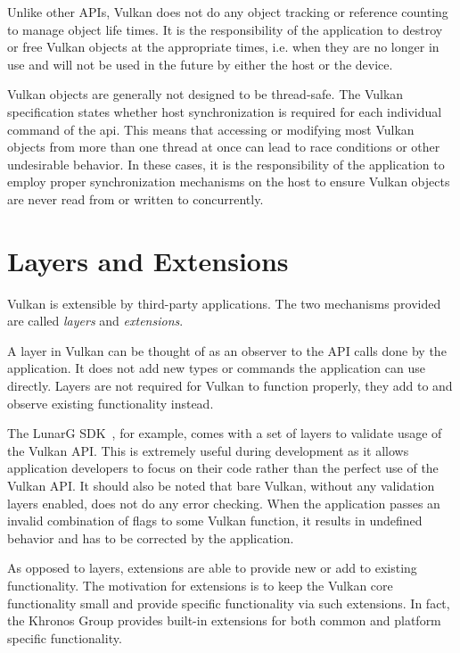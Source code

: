     Unlike other APIs, Vulkan does not do any object tracking or reference counting to manage object life times.
    It is the responsibility of the \gls{application} to destroy or free Vulkan objects at the appropriate times, i.e.
    when they are no longer in use and will not be used in the future by either the \gls{host} or the device.

    Vulkan objects are generally not designed to be thread-safe.
    The Vulkan specification states whether \gls{host} synchronization is required for each individual command of the \gls{api}.
    This means that accessing or modifying most Vulkan objects from more than one thread at once can lead to race conditions or other undesirable behavior.
    In these cases, it is the responsibility of the \gls{application} to employ proper synchronization mechanisms on the \gls{host} to ensure Vulkan objects are never read from or written to concurrently.

  \section{Layers and Extensions}
  \label{sec:LayersAndExtensions}
    Vulkan is extensible by third-party \glspl{application}.
    The two mechanisms provided are called \textit{layers} and \textit{extensions}.

    A layer in Vulkan can be thought of as an observer to the API calls done by the \gls{application}.
    It does not add new types or commands the \gls{application} can use directly.
    Layers are not required for Vulkan to function properly, they add to and observe existing functionality instead.

    The LunarG SDK~\cite{lunargvulkansdk}, for example, comes with a set of layers to validate usage of the Vulkan API. This is extremely useful during development as it allows application developers to focus on their code rather than the perfect use of the Vulkan API. It should also be noted that bare Vulkan, without any validation layers enabled, does not do any error checking. When the \gls{application} passes an invalid combination of flags to some Vulkan function, it results in undefined behavior and has to be corrected by the \gls{application}.

    As opposed to layers, extensions are able to provide new or add to existing functionality. The motivation for extensions is to keep the Vulkan core functionality small and provide specific functionality via such extensions. In fact, the Khronos Group provides built-in extensions for both common and platform specific functionality.

